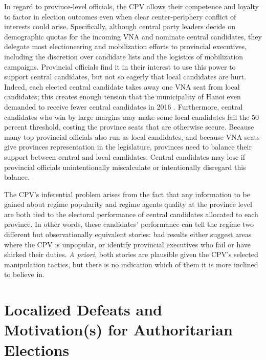 \documentclass[12pt]{article}
\newcommand{\1}{\mathbbm{1}}
\begin{document}
In regard to province-level officials, the CPV allows their competence and loyalty to factor in election outcomes even when clear center-periphery conflict of interests could arise. Specifically, although central party leaders decide on demographic quotas for the incoming VNA and nominate central candidates, they delegate most electioneering and mobilization efforts to provincial executives, including the discretion over candidate lists and the logistics of mobilization campaigns. Provincial officials find it in their interest to use this power to support central candidates, but not so eagerly that local candidates are hurt. Indeed, each elected central candidate takes away one VNA seat from local candidates; this creates enough tension that the municipality of Hanoi even demanded to receive fewer central candidates in 2016 \citep{vnexpress2016_2}. Furthermore, central candidates who win by large margins may make some local candidates fail the 50 percent threshold, costing the province seats that are otherwise secure. Because many top provincial officials also run as local candidates, and because VNA seats give provinces representation in the legislature, provinces need to balance their support between central and local candidates. Central candidates may lose if provincial officials unintentionally miscalculate or intentionally disregard this balance.

The CPV's inferential problem arises from the fact that any information to be gained about regime popularity and regime agents quality at the province level are both tied to the electoral performance of central candidates allocated to each province. In other words, these candidates' performance can tell the regime two different but observationally equivalent stories: bad results either suggest areas where the CPV is unpopular, or identify provincial executives who fail or have shirked their duties. \textit{A priori}, both stories are plausible given the CPV's selected manipulation tactics, but there is no indication which of them it is more inclined to believe in.

\section*{Localized Defeats and Motivation(s) for Authoritarian Elections}
\label{sec:theory_local_defeat}
\end{document}

